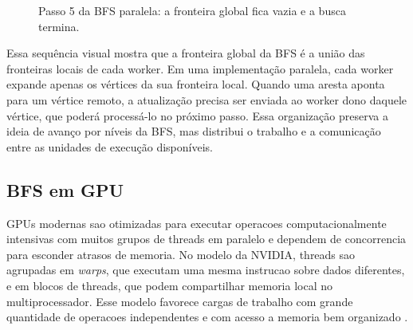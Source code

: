 \begin{figure}[H]
\centering
{}
\caption{Passo 5 da BFS paralela: a fronteira global fica vazia e a busca termina.}
\label{fig:bfs-paralela-step5}
\end{figure}

Essa sequência visual mostra que a fronteira global da BFS é a união das
fronteiras locais de cada worker. Em uma implementação paralela, cada worker
expande apenas os vértices da sua fronteira local. Quando uma aresta aponta para
um vértice remoto, a atualização precisa ser enviada ao worker dono daquele
vértice, que poderá processá-lo no próximo passo. Essa organização preserva a
ideia de avanço por níveis da BFS, mas distribui o trabalho e a comunicação entre
as unidades de execução disponíveis.

\subsection{BFS em GPU}
GPUs modernas sao otimizadas para executar operacoes computacionalmente intensivas 
com muitos grupos de threads em paralelo e dependem de concorrencia para esconder 
atrasos de memoria. No modelo da NVIDIA, threads sao agrupadas em \textit{warps}, 
que executam uma mesma instrucao sobre dados diferentes, e em blocos de threads, 
que podem compartilhar memoria local no multiprocessador. Esse modelo favorece 
cargas de trabalho com grande quantidade de operacoes independentes e com acesso 
a memoria bem organizado \cite{merrillgpu}.

